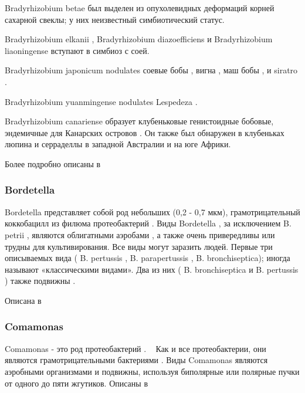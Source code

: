 \documentclass[11pt]{article}
\begin{document}
	Bradyrhizobium betae был выделен из опухолевидных деформаций корней сахарной свеклы; у них неизвестный симбиотический статус. ~\cite{Bradyrhizobium_14}
	
	Bradyrhizobium elkanii , Bradyrhizobium diazoefficiens и Bradyrhizobium liaoningense вступают в симбиоз с соей. ~\cite{Bradyrhizobium_14}
	
	Bradyrhizobium japonicum nodulates соевые бобы , вигна , маш бобы , и siratro . ~\cite{Bradyrhizobium_14}
	
	Bradyrhizobium yuanmingense nodulates Lespedeza . ~\cite{Bradyrhizobium_14}
	
	Bradyrhizobium canariense образует клубеньковые генистоидные бобовые, эндемичные для Канарских островов . Он также был обнаружен в клубеньках люпина и серраделлы в западной Австралии и на юге Африки. ~\cite{Bradyrhizobium_14}
	
	Более подробно описаны в ~\cite{Bradyrhizobium_1, Bradyrhizobium_2,Bradyrhizobium_3,Bradyrhizobium_4,Bradyrhizobium_5,Bradyrhizobium_6,Bradyrhizobium_7,Bradyrhizobium_8,Bradyrhizobium_9,Bradyrhizobium_10,Bradyrhizobium_11,Bradyrhizobium_12,Bradyrhizobium_13,Bradyrhizobium_14,Bradyrhizobium_15,Bradyrhizobium_16,Bradyrhizobium_17,Bradyrhizobium_18}
	
	\subsubsection{Bordetella}
	Bordetella представляет собой род небольших (0,2 - 0,7 мкм), грамотрицательный коккобацилл из филюма протеобактерий . Виды Bordetella , за исключением B. petrii , являются облигатными аэробами , а также очень привередливы или трудны для культивирования. Все виды могут заразить людей. Первые три описываемых вида ( B. pertussis , B. parapertussis , B. bronchiseptica); иногда называют «классическими видами». Два из них ( B. bronchiseptica и B. pertussis ) также подвижны . ~\cite{Bordetella_2, Bordetella_3}
	
	Описана в ~\cite{Bordetella_1,Bordetella_2,Bordetella_3,Bordetella_4,Bordetella_5,Bordetella_6,Bordetella_7,Bordetella_8,Bordetella_9,Bordetella_10, Bordetella_11, Bordetella_12, Bordetella_13, Bordetella_14, Bordetella_15, Bordetella_16, Bordetella_17, Bordetella_18}
	
	\subsubsection{Comamonas}
	Comamonas - это род протеобактерий . ~\cite{Comamonas_2} Как и все протеобактерии, они являются грамотрицательными бактериями . Виды Comamonas являются аэробными организмами и подвижны, используя биполярные или полярные пучки от одного до пяти жгутиков.
	Описаны в ~\cite{Comamonas_1, Comamonas_2}
	
\end{document}
